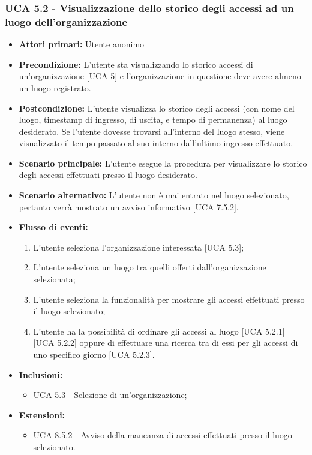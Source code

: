 \subsubsection{UCA 5.2 - Visualizzazione dello storico degli accessi ad un luogo dell'organizzazione}
\begin{itemize}
    \item \textbf{Attori primari:} Utente anonimo
    \item \textbf{Precondizione:} L'utente sta visualizzando lo storico accessi di un'organizzazione [UCA 5] e l'organizzazione in questione deve avere almeno un luogo registrato.
    \item \textbf{Postcondizione:} L'utente visualizza lo storico degli accessi (con nome del luogo, timestamp di ingresso, di uscita, e tempo di permanenza) al luogo desiderato. Se l'utente dovesse trovarsi all'interno del luogo stesso, viene visualizzato il tempo passato al suo interno dall'ultimo ingresso effettuato.
    \item \textbf{Scenario principale:} L'utente esegue la procedura per visualizzare lo storico degli accessi effettuati presso il luogo desiderato.
    \item \textbf{Scenario alternativo:} L'utente non è mai entrato nel luogo selezionato, pertanto verrà mostrato un avviso informativo [UCA 7.5.2].
    \item \textbf{Flusso di eventi:}
    \begin{enumerate}
        \item L'utente seleziona l'organizzazione interessata [UCA 5.3];
        \item L'utente seleziona un luogo tra quelli offerti dall'organizzazione selezionata;
        \item L'utente seleziona la funzionalità per mostrare gli accessi effettuati presso il luogo selezionato;
        \item L'utente ha la possibilità di ordinare gli accessi al luogo [UCA 5.2.1] [UCA 5.2.2] oppure di effettuare una ricerca tra di essi per gli accessi di uno specifico giorno [UCA 5.2.3].
    \end{enumerate}
    \item \textbf{Inclusioni:}
    \begin{itemize}
        \item UCA 5.3 - Selezione di un'organizzazione;
    \end{itemize}
    \item \textbf{Estensioni:}
    \begin{itemize}
        \item UCA 8.5.2 - Avviso della mancanza di accessi effettuati presso il luogo selezionato.
    \end{itemize}
\end{itemize}


